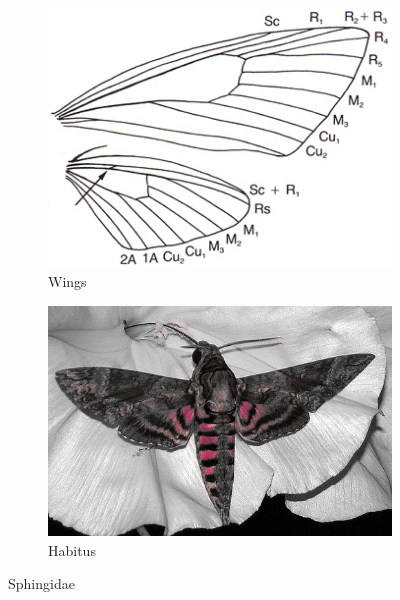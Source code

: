 \documentclass[letterpaper, 11pt]{article}
\begin{document}
\begin{figure}[ht!]
    \centering
    \begin{subfigure}[ht!]{0.35\textwidth}
        \includegraphics[width=\textwidth]{image15}
        \caption{Wings}
        \label{fig:sphingid1}
    \end{subfigure}
    \qquad %
    \begin{subfigure}[ht!]{0.4\textwidth}
        \includegraphics[width=\textwidth]{image14}
        \caption{Habitus}
        \label{fig:sphingid2}
    \end{subfigure}
    \caption{Sphingidae}\label{fig:sphingids}
\end{figure}
\end{document}
